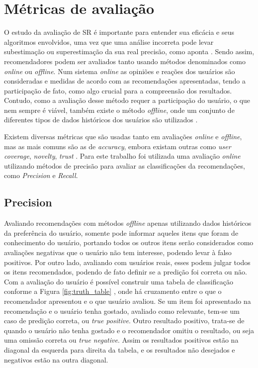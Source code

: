 \section{Métricas de avaliação}

O estudo da avaliação de \ac{SR} é importante para entender sua eficácia e seus algoritmos envolvidos, uma vez que uma análise incorreta pode levar subestimação ou superestimação da sua real precisão, como aponta \cite{Aggarwal2016:Evaluation}. Sendo assim, recomendadores podem ser avaliados tanto usando métodos denominados como \textit{online} ou \textit{offline}. Num sistema \textit{online} as opiniões e reações dos usuários são consideradas e medidas de acordo com as recomendações apresentadas, tendo a participação de fato, como algo crucial para a compreensão dos resultados. Contudo, como a avaliação desse método requer a participação do usuário, o que nem sempre é viável, também existe o método \textit{offline}, onde um conjunto de diferentes tipos de dados históricos dos usuários são utilizados \citep{Herlocker:1999}.

Existem diversas métricas que são usadas tanto em avaliações \textit{online} e \textit{offline}, mas as mais comuns são as de \textit{accuracy}, embora existam outras como \textit{user coverage}, \textit{novelty}, \textit{trust} \citep{Jannach:2010}. Para este trabalho foi utilizada uma avaliação \textit{online} utilizando métodos de precisão para avaliar as classificações da recomendações, como \textit{Precision} e \textit{Recall}.

\subsection{Precision}

Avaliando recomendações com métodos \textit{offline} apenas utilizando dados históricos da preferência do usuário, somente pode informar aqueles itens que foram de conhecimento do usuário, portando todos os outros itens serão considerados como avaliações negativas que o usuário não tem interesse, podendo levar à falso positivos. Por outro lado, avaliando com usuários reais, esses podem julgar todos os itens recomendados, podendo de fato definir se a predição foi correta ou não. Com a avaliação do usuário é possível construir uma tabela de classificação conforme a Figura \ref{fig:truth_table} \citep{Jannach:2010}, onde há cruzamento entre o que o recomendador apresentou e o que usuário avaliou. Se um item foi apresentado na recomendação e o usuário tenha gostado, avaliado como relevante, tem-se um caso de predição correta, ou \textit{true positive}. Outro resultado positivo, trata-se de quando o usuário não tenha gostado e o recomendador omitiu o resultado, ou seja uma omissão correta ou \textit{true negative}. Assim os resultados positivos estão na diagonal da esquerda para direita da tabela, e os resultados não desejados e negativos estão na outra diagonal. 

